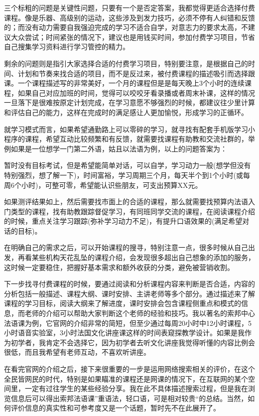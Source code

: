 \documentclass[
]{book}
\begin{document}
三个标粗的问题是关键性问题，只要有一个是否定答案，我都觉得更适合选择付费课程。像是乐器、高级别的运动，这些涉及到发力技巧，必须不停有人纠错和反馈的；而没有动力需要自我强迫完成的学习不适合自学，对意志力的要求太高，不建议大众尝试；时间紧张的情况下，建议也是用钱买时间，参加付费学习项目，节省自己搜集学习资料进行学习管控的精力。

剩余的问题则是指引大家选择合适的付费学习项目，特别要注意，是根据自己的时间、计划和节奏来找合适的项目，而不是反过来，被付费课程的描述吸引而选择跟课。一个课程描述写的非常美好，一个月的课程但是是每天晚上3个小时的连续课程，如果自己对应加班的时间，觉得可以咬咬牙看录播或者周末补课，这样的情况一旦落下是很难按原定计划完成，在学习意愿不够强烈的时候，都建议往少里计算和评估自己的能力，这样在完成时的满足感让人更加愉悦，形成学习的正循环。

就学习模式而言，如果希望通勤路上可以零碎的学习，就寻找有配套手机版学习小程序的课程，希望互动比较频繁和有反馈，就需要找课程有助教和交流社群的，举例如果是一位想学一门第二外语，姑且以法语为例，以上的问题答案为：

暂时没有目标考试，但是希望能简单对话，可以自学，学习动力一般(想学但没有特别强烈，想了解一下)，时间富裕，学习周期三个月，每天半个到1个小时(或每周6个小时)，可整可零，希望能认识些朋友，可支出预算XX元。

如果测评结果如上，然后需要找市面上的合适的课程，那么就需要找预算内法语入门类型的课程，找有助教跟踪督促学习，有同班同学交流的课程，在阅读课程介绍的时候，重点关注学习跟踪(弥补学习动力不足)，有提升口语效果的(满足希望对话的目标)。

在明确自己的需求之后，可以开始课程的搜寻，特别注意一点，很多时候从自己出发，再看某些机构天花乱坠的课程介绍，会发现很多超出自己想象的添加的服务，这时候一定要稳住，把握好基本需求和额外收获的分类，避免被营销收割。

下一步找寻付费课程的时候，要通过阅读和分析课程内容来判断是否合适，内容的分析包括一般描述、课程大纲、课时安排、主讲老师等多个部分。通过描述来了解课程的学习目标，阅读大纲来了解进度，课时安排会包含课程侧重点和模式的信息，而老师的介绍可以帮助大家判断这个老师的经验和技巧。我以著名的索邦中心法语课为例，它官网的介绍非常的简短，但至少通过每周20小时中12小时课程，5小时语音实验室，3小时法国文化讲座课这样的时间表窥探教学设计。如果是我作为初学者，我肯定不会选择它，因为初学者去听文化讲座我觉得听懂的内容比例会很低，而且我希望有老师互动，不喜欢听讲座。

在看完官网的介绍之后，接下来很重要的一步是运用网络搜索相关的评价，在这个全民皆网民的时代，特别是如果瞄准的课程还是网课的情况下，在互联网的某个空间里，一定有过往学生的某些经验分享。我在此不具体描述搜索过程，但是我在浏览信息后可以得出索邦法语课''重语法，轻口语，可是相对较贵``的总结。当然，如何评价信息的真实性和可参考度又是一个话题，暂时先不在此展开了。
\end{document}
